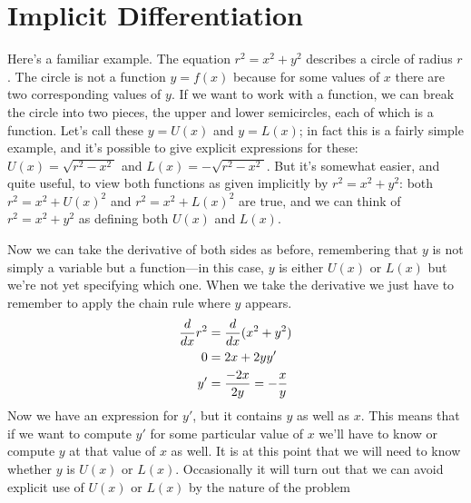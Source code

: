 \section{Implicit Differentiation}



Here's a familiar example. The equation $r^2=x^2+y^2$
describes a circle of radius $r$. The circle is not a function
$y=f(x)$ because for some values of $x$ there are two corresponding
values of $y$. If we want to work with a function, we can break the
circle into two pieces, the upper and lower semicircles, each of which
is a function. Let's call these $y=U(x)$ and $y=L(x)$; in fact this is
a fairly simple example, and it's possible to give explicit
expressions for these: $U(x)=\sqrt{r^2-x^2\ }$ and
$L(x)=-\sqrt{r^2-x^2\ }$.  But it's somewhat easier, and quite useful,
to view both functions as given implicitly by $r^2=x^2+y^2$: both
$r^2=x^2+U(x)^2$ and $r^2=x^2+L(x)^2$ are true, and we can think of 
$r^2=x^2+y^2$ as defining both $U(x)$ and $L(x)$.

Now we can take the derivative of both sides as before, remembering
that $y$ is not simply a variable but a function---in this case, $y$
is either $U(x)$ or $L(x)$ but we're not yet specifying which one.
When we take the derivative we just have to remember to apply the
chain rule where $y$ appears.
\begin{align*}
{d\over dx}r^2&={d\over dx}(x^2+y^2) \\
0&=2x+2yy' \\
y'&={-2x\over 2y}=-{x\over y} \\
\end{align*}
Now we have an expression for $y'$, but it contains $y$ as well as
$x$. This means that if we want to compute $y'$ for some particular
value of $x$ we'll have to know or compute $y$ at that value of $x$ as
well. It is at this point that we will need to know whether $y$ is
$U(x)$ or $L(x)$. Occasionally it will turn out that we can avoid
explicit use of $U(x)$ or $L(x)$ by the nature of the problem

